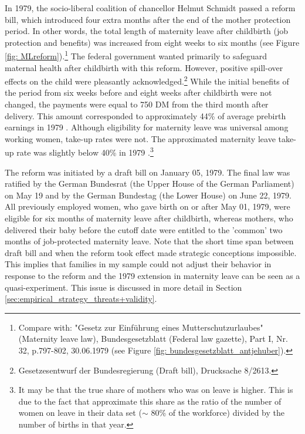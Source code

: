 \documentclass[11pt, a4paper,draft]{article} %
\begin{document}
In 1979, the socio-liberal coalition of chancellor Helmut Schmidt passed a reform bill, which introduced four extra months after the end of the mother protection period. In other words, the total length of maternity leave after childbirth (job protection and benefits) was increased from eight weeks to six months (see Figure \ref{fig: MLreform}).\footnote{Compare with: "Gesetz zur Einführung eines Mutterschutzurlaubes" (Maternity leave law), Bundesgesetzblatt (Federal law gazette), Part I, Nr. 32, p.797-802, 30.06.1979 (see Figure \ref{fig: bundesgesetzblatt_antjehuber}).} The federal government wanted primarily to safeguard maternal health after childbirth with this reform. However, positive spill-over effects on the child were pleasantly acknowledged.\footnote{Gesetzesentwurf der Bundesregierung (Draft bill), Drucksache 8/2613.} While the initial benefits of the period from six weeks before and eight weeks after childbirth were not changed, the payments were equal to 750 DM from the third month after delivery. This amount corresponded to approximately 44\% of average prebirth earnings in 1979 \citep{schonberg2014expansions}. Although eligibility for maternity leave was universal among working women, take-up rates were not. The approximated maternity leave take-up rate was slightly below 40\% in 1979 \citep{Dustmann2012}.\footnote{It may be that the true share of mothers who was on leave is higher. This is due to the fact that \cite{Dustmann2012} approximate this share as the ratio of the number of women on leave in their data set ($\sim$ 80\% of the workforce) divided by the number of births in that year.}
\newline

The reform was initiated by a draft bill on January 05, 1979. The final law was ratified by the German Bundesrat (the Upper House of the German Parliament) on May 19 and by the German Bundestag (the Lower House) on June 22, 1979. All previously employed women, who gave birth on or after May 01, 1979, were eligible for six months of maternity leave after childbirth, whereas mothers, who delivered their baby before the cutoff date were entitled to the 'common' two months of job-protected maternity leave. Note that the short time span between draft bill and when the reform took effect made strategic conceptions impossible. This implies that families in my sample could not adjust their behavior in response to the reform and the 1979 extension in maternity leave can be seen as a quasi-experiment. This issue is discussed in more detail in Section \ref{sec:empirical_strategy_threats+validity}.\newline
\end{document}
